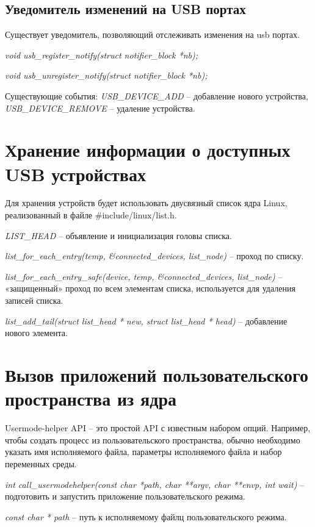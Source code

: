 \subsection{\textbf{Уведомитель изменений на USB портах}}

Существует уведомитель, позволяющий отслеживать изменения на usb портах. \cite{usbnotifications}

\textit{void usb\_register\_notify(struct notifier\_block *nb);}

\textit{void usb\_unregister\_notify(struct notifier\_block *nb);}

Существующие события: \textit{USB\_DEVICE\_ADD} -- добавление нового устройства, \textit{USB\_DEVICE\_REMOVE} -- удаление устройства.

\section{\textbf{Хранение информации о доступных USB устройствах}}

Для хранения устройств будет использовать двусвязный список ядра Linux, реализованный в файле \#include/linux/list.h. \cite{lists}

\textit{LIST\_HEAD} -- объявление и инициализация головы списка.

\textit{list\_for\_each\_entry(temp, \&connected\_devices, list\_node)} -- проход по списку.

\textit{list\_for\_each\_entry\_safe(device, temp, \&connected\_devices, list\_node)} -- «защищенный» проход по всем элементам списка, используется для удаления записей списка.

\textit{list\_add\_tail(struct list\_head * new, struct list\_head * head) }-- добавление нового элемента.

\section{\textbf{Вызов приложений пользовательского пространства из ядра}}

Usermode-helper API -- это простой API с известным набором опций. Например, чтобы создать процесс из пользовательского пространства, обычно необходимо указать имя исполняемого файла, параметры исполняемого файла и набор переменных среды. \cite{userspace}

\textit{int call\_usermodehelper(const char *path, char **argv, char **envp, int wait)} -- подготовить и запустить приложение пользовательского режима.

\textit{const char * path} -- путь к исполняемому файлц пользовательского режима.

